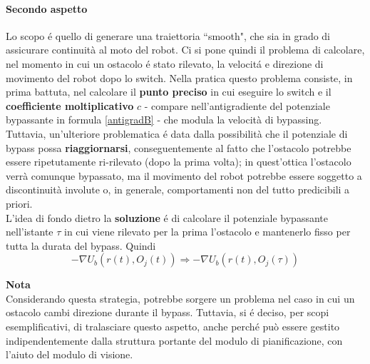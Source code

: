 \documentclass[14pt,a4paper]{extarticle}
\begin{document}
\paragraph{Secondo aspetto}
Lo scopo é quello di generare una traiettoria ``smooth", che sia in grado di assicurare continuità al moto del robot. Ci si pone quindi il problema di calcolare, nel momento in cui un ostacolo é stato rilevato, la velocitá e direzione di movimento del robot dopo lo switch. Nella pratica questo problema consiste, in prima battuta, nel calcolare il \textbf{punto preciso} in cui eseguire lo switch e il \textbf{coefficiente moltiplicativo} \(c\) - compare nell'antigradiente del potenziale bypassante in formula \ref{antigradB} - che modula la velocità di bypassing. Tuttavia, un'ulteriore problematica é data dalla possibilità che il potenziale di bypass possa \textbf{riaggiornarsi}, conseguentemente al fatto che l'ostacolo potrebbe essere ripetutamente ri-rilevato (dopo la prima volta); in quest'ottica l'ostacolo verrà comunque bypassato, ma il movimento del robot potrebbe essere soggetto a discontinuità involute o, in generale, comportamenti non del tutto predicibili a priori. \\
L'idea di fondo dietro la \textbf{soluzione} é di calcolare il potenziale bypassante nell'istante \(\tau\) in cui viene rilevato per la prima l'ostacolo e mantenerlo fisso per tutta la durata del bypass. Quindi \[-\nabla U_b \left( r(t) , O_j(t) \right) \Rightarrow -\nabla U_b \left( r(t) , O_j(\tau) \right) \]
\begin{nota}
\textbf{Nota} \\ Considerando questa strategia, potrebbe sorgere un problema nel caso in cui un ostacolo cambi direzione durante il bypass. Tuttavia, si é deciso, per scopi esemplificativi, di tralasciare questo aspetto, anche perché può essere gestito indipendentemente dalla struttura portante del modulo di pianificazione, con l'aiuto del modulo di visione.
\end{nota}
\end{document}
